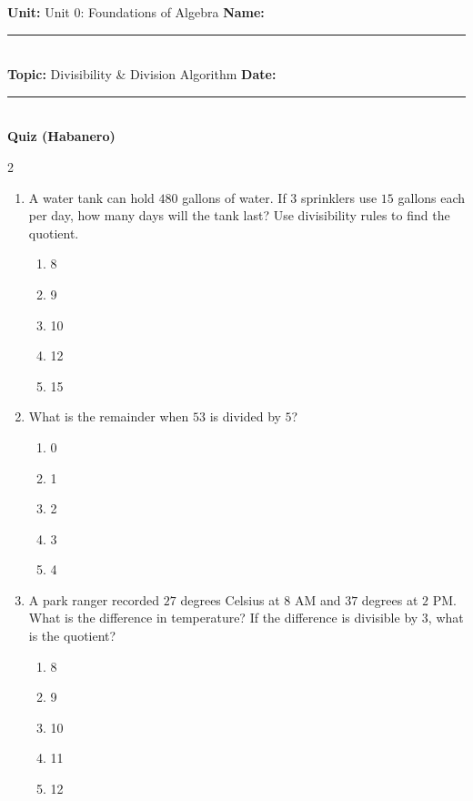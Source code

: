\documentclass[10pt]{article}
\begin{document}
\enlargethispage{2.5cm}

\begin{tcolorbox}[colback=mainblue!5, colframe=mainblue, sharp corners, boxrule=0.5pt]
    \small \textbf{Unit:} Unit 0: Foundations of Algebra \hfill \textbf{Name:} \rule{3cm}{0.4pt} \\
    \small \textbf{Topic:} Divisibility & Division Algorithm \hfill \textbf{Date:} \rule{2cm}{0.4pt} \\
    \centering \textbf{\large Quiz (Habanero)}
\end{tcolorbox}

\vspace{0.2cm}

\begin{multicols}{2}
\begin{enumerate}[label=\textbf{Q\arabic*.}, leftmargin=*, itemsep=6pt, parsep=0pt]

  \item \small A water tank can hold $480$ gallons of water. If $3$ sprinklers use $15$ gallons each per day, how many days will the tank last? Use divisibility rules to find the quotient.
  \begin{enumerate}[label=(\Alph*), leftmargin=0.6cm, nosep, itemsep=2pt]
    \item 8
    \item 9
    \item 10
    \item 12
    \item 15
  \end{enumerate}

  \item \small What is the remainder when $53$ is divided by $5$?
  \begin{enumerate}[label=(\Alph*), leftmargin=0.6cm, nosep, itemsep=2pt]
    \item 0
    \item 1
    \item 2
    \item 3
    \item 4
  \end{enumerate}

  \item \small A park ranger recorded $27$ degrees Celsius at $8$ AM and $37$ degrees at $2$ PM. What is the difference in temperature? If the difference is divisible by $3$, what is the quotient?
  \begin{enumerate}[label=(\Alph*), leftmargin=0.6cm, nosep, itemsep=2pt]
    \item 8
    \item 9
    \item 10
    \item 11
    \item 12
  \end{enumerate}


\end{enumerate}
\end{multicols}
\end{document}
